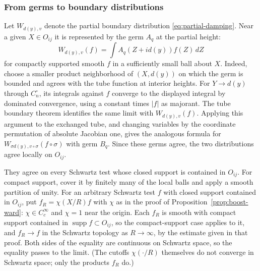 \subsubsection{From germs to boundary distributions}
Let $W_{d(y),v}$ denote the partial boundary distribution
\eqref{eq:partial-damping}. Near a given $X\in O_{ij}$ it is represented
by the germ $A_q$ at the partial height:
\begin{equation}\label{eq:germ-boundary-integral}
 W_{d(y),v}(f)=\int A_q(Z+i d(y))f(Z)\,dZ
\end{equation}
for compactly supported smooth $f$ in a sufficiently small ball about $X$.
Indeed, choose a smaller product neighborhood of $(X,d(y))$ on which
the germ is bounded and agrees with the tube function at interior heights.
For $Y\to d(y)$ through $C_n^\circ$, its integrals against $f$ converge
to the displayed integral by dominated convergence, using a constant times
$|f|$ as majorant. The tube boundary theorem identifies the same limit
with $W_{d(y),v}(f)$. Applying this argument to the exchanged tube, and
changing variables by the coordinate permutation of absolute Jacobian one,
gives the analogous formula for
$W_{\sigma d(y),v\circ\sigma}(f\circ\sigma)$ with germ $B_q$.
Since these germs agree, the two distributions agree locally on $O_{ij}$.

They agree on every Schwartz test whose closed support is contained in
$O_{ij}$. For compact support, cover it by finitely many of the local
balls and apply a smooth partition of unity. For an arbitrary
Schwartz test $f$ with closed support contained in $O_{ij}$, put
$f_R=\chi(X/R)f$ with $\chi$ as in the proof of
Proposition~\ref{prop:boost-ward}: $\chi\in C_c^\infty$ and $\chi=1$ near
the origin. Each $f_R$ is smooth with compact support contained in
$\operatorname{supp}f\subset O_{ij}$, so the compact-support case applies
to it, and $f_R\to f$ in the Schwartz topology as $R\to\infty$, by the
estimate given in that proof. Both sides of the equality are continuous
on Schwartz space, so the equality passes to the limit. (The cutoffs
$\chi(\cdot/R)$ themselves do not converge in Schwartz space; only the
products $f_R$ do.)

